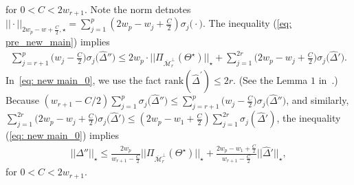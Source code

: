 \documentclass[12pt]{article}
\begin{document}
for $0 < C < 2w_{r+1}$.
Note the norm detnotes $ ||\cdot||_{2w_{p} - w + \frac{C}{2}, \star} = \sum^{p}_{j = 1} (2w_{p}-w_{j}+\frac{C}{2}) \sigma_{j}\big(\cdot\big)$.
The inequality (\ref{eq: pre_new_main}) implies
\begin{eqnarray}
    \sum^{p}_{j = r+1}\bigg(w_{j} - \frac{C}{2}\bigg)\sigma_{j}\big(\widehat{\Delta}''\big) \leq  2w_{p} \cdot ||\Pi_{\overline{\mathcal{M}}_{r}^{\perp}}(\Theta^{\star})||_{\star} + \sum^{2r}_{j = 1} \bigg(2w_{p}-w_{j} + \frac{C}{2} \bigg) \sigma_{j}\big(\widehat{\Delta}'\big). \label{eq: new main_0}
\end{eqnarray}
\noindent
In~\eqref{eq: new main_0}, we use the fact $\text{rank}(\widehat{\Delta}^{'}) \leq 2r$.
(See the Lemma $1$ in~\cite{negahban2011estimation}.)
Because  $(w_{r+1} - C/2)\sum^{p}_{j = 1}\sigma_{j}\big(\widehat{\Delta}''\big) \leq \sum^{p}_{j = r+1}\big(w_{j} - \frac{C}{2}\big)\sigma_{j}\big(\widehat{\Delta}''\big)$, and similarly, $\sum^{2r}_{j = 1}\big(2w_{p} - w_{j} +  \frac{C}{2}\big)\sigma_{j}\big(\widehat{\Delta}'\big)\leq (2w_{p}-w_{1}+\frac{C}{2})\sum_{j=1}^{2r}\sigma_{j}(\widehat{\Delta}')$,
the inequality (\ref{eq: new main_0}) implies 
\begin{align}
    ||\widehat{\Delta}''||_{\star} \leq \frac{2w_{p}}{w_{r+1}-\frac{C}{2}}||\Pi_{\overline{\mathcal{M}}_{r}^{\perp}}(\Theta^{\star})||_{\star} + \frac{2w_{p} - w_{1} + \frac{C}{2}}{w_{r+1}-\frac{C}{2}}||\widehat{\Delta}'||_{\star},
    \label{eq: new main_1}
\end{align}
for $0 < C < 2 w_{r+1}$.
\end{document}
